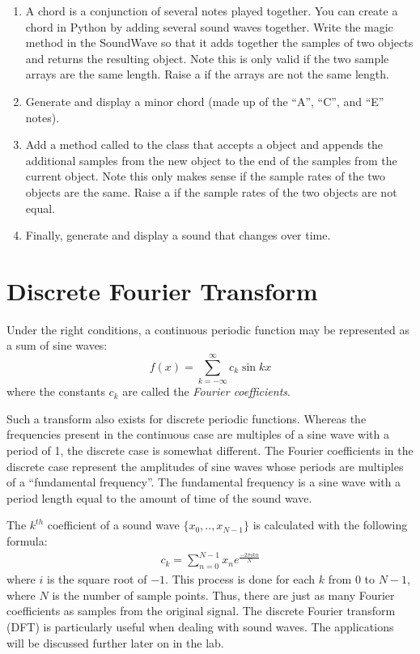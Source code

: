 \begin{problem}
\leavevmode
\begin{enumerate}
\item A chord is a conjunction of several notes played together.
You can create a chord in Python by adding several sound waves together.
Write the  magic method in the SoundWave so that it adds together the samples of two  objects and returns the resulting  object.
Note this is only valid if the two sample arrays are the same length.
Raise a  if the arrays are not the same length.
\item Generate and display a minor chord (made up of the ``A'', ``C'', and ``E'' notes).
\item Add a method called  to the  class that accepts a  object and appends the additional samples from the new object to the end of the samples from the current object.
Note this only makes sense if the sample rates of the two objects are the same.
Raise a  if the sample rates of the two objects are not equal.
\item Finally, generate and display a sound that changes over time.

\end{enumerate}
\end{problem}

\section*{Discrete Fourier Transform} %

Under the right conditions, a continuous periodic function may be represented as a sum of sine waves:
\[
f(x) = \displaystyle{\sum_{k=-\infty}^{\infty}} c_k \sin{kx}
\]
where the constants $c_k$ are called the \emph{Fourier coefficients}.

Such a transform also exists for discrete periodic functions.
Whereas the frequencies present in the continuous case are multiples of a sine wave with a period of 1, the discrete case is somewhat different.
The Fourier coefficients in the discrete case represent the amplitudes of sine waves whose periods are multiples of a ``fundamental frequency''.
The fundamental frequency is a sine wave with a period length equal to the amount of time of the sound wave.

The $k^{th}$ coefficient of a sound wave $\{x_0, .., x_{N-1}\}$ is calculated with the following formula:
\begin{align}
c_k = \displaystyle{\sum_{n=0}^{N-1}} x_n e^{\frac{-2\pi ikn}{N}}\label{eq:ck}
\end{align}
where $i$ is the square root of $-1$.
This process is done for each $k$ from $0$ to $N-1$, where $N$ is the number of sample points.
Thus, there are just as many Fourier coefficients as samples from the original signal.
The discrete Fourier transform (DFT) is particularly useful when dealing with sound waves.
The applications will be discussed further later on in the lab.

